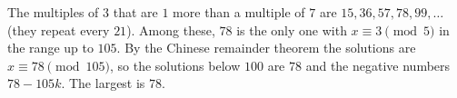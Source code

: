The multiples of $3$ that are $1$ more than a multiple of $7$ are $15,36,57,78,99,\dots$ (they repeat every $21$). Among these, $78$ is the only one with $x\equiv3\pmod5$ in the range up to $105$. By the Chinese remainder theorem the solutions are $x\equiv78\pmod{105}$, so the solutions below $100$ are $78$ and the negative numbers $78-105k$. The largest is $\boxed{78}$.

